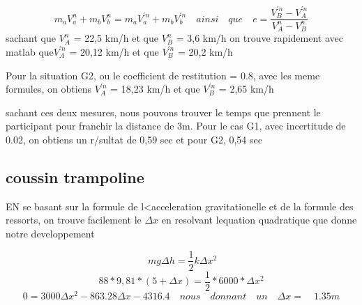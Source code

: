 \documentclass{article}
\begin{document}
 \begin{equation}
 m_{a}V_{a}^{n} + m_{b}V_{b}^{n} = m_{a}V_{a}^{'n} + m_{b}V_{b}^{'n}  \quad ainsi \quad que \quad e = \frac {V_{B}^{'n}-V_{A}^{'n}}{V_{A}^{n}-V_{B}^{n}} 
 \end{equation}
 sachant que $ V_{A}^{n}$ = 22,5 km/h et que $V_{B}^{n}$ = 3,6 km/h on trouve rapidement avec matlab que$ V_{A}^{'n}$ = 20,12 km/h et que $V_{B}^{'n}$ = 20,2 km/h 
 
\vspace*{7mm}
 Pour la situation G2, ou le coefficient de restitution = 0.8, avec les meme formules, on obtiens $ V_{A}^{'n}$ = 18,23 km/h et que $V_{B}^{'n}$ = 2,65 km/h 
 
 sachant ces deux mesures, nous pouvons trouver le temps que prennent le participant pour franchir la distance de 3m. Pour le cas G1, avec incertitude de 0.02, on obtiens un r/sultat de 0,59 sec et pour G2, 0,54 sec
 
 \subsection{coussin trampoline}
 
 EN se basant sur la formule de l<acceleration gravitationelle et de la formule des ressorts, on trouve facilement le $\Delta x$ en resolvant lequation quadratique que donne notre developpement
 
 \begin{equation}
\ mg \Delta h = \frac{1}{2}k \Delta x ^2
 \end{equation}
 \begin{equation}
 88*9,81*(5+\Delta x) = \frac{1}{2}*6000*\Delta x^2 
 \end{equation}
 \begin{equation}
 0 = 3000\Delta x^2 - 863.28 \Delta x - 4316.4 \quad nous\quad  donnant\quad  un\quad  \Delta x=\quad 1.35m 
 \end{equation}
\end{document}

